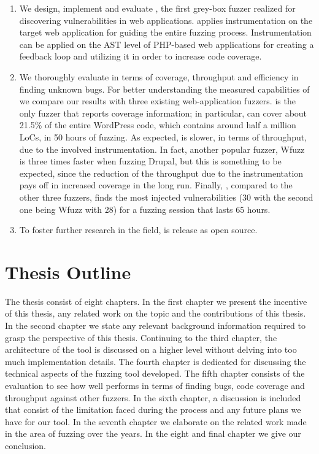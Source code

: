 \begin{enumerate}

\item We design, implement and evaluate \pname{}, the first grey-box fuzzer realized for discovering vulnerabilities in web applications. \pname{} applies instrumentation on the target web application for guiding the entire fuzzing process. Instrumentation can be applied on the AST level of PHP-based web applications for creating a feedback loop and utilizing it in order to increase code coverage.
\item We thoroughly evaluate \pname{} in terms of coverage, throughput and efficiency in finding unknown bugs. For better understanding the measured capabilities of \pname{} we compare our results with three existing web-application fuzzers. \pname{} is the only fuzzer that
reports coverage information; in particular, \pname{} can cover about 21.5\% of the entire WordPress code, which contains around half a million LoCs, in 50 hours of fuzzing. As expected, \pname{} is slower, in terms of throughput, due to the involved instrumentation. In fact, another popular fuzzer, Wfuzz ~\cite{wfuzz} is three times faster when fuzzing Drupal, but this is something to be expected, since the reduction of the throughput due to the instrumentation pays off in increased coverage in the long run. Finally, \pname{}, compared to the other three fuzzers, finds the most injected vulnerabilities (30 with the second one being Wfuzz with 28) for a fuzzing session that lasts 65 hours.
\item To foster further research in the field, \pname{} is release as open source.

\end{enumerate}

\section{Thesis Outline}
The thesis consist of eight chapters. In the first chapter we present the incentive of this thesis, any related work on the topic and the contributions of this thesis. In the second chapter we state any relevant background information required to grasp the perspective of this thesis. Continuing to the third chapter, the architecture of the tool is discussed on a higher level without delving into too much implementation details. The fourth chapter is dedicated for discussing the technical aspects of the fuzzing tool developed. The fifth chapter consists of the evaluation to see how well \pname{} performs in terms of finding bugs, code coverage and throughput against other fuzzers. In the sixth chapter, a discussion is included that consist of the limitation faced during the process and any future plans we have for our tool. In the seventh chapter we elaborate on the related work made in the area of fuzzing over the years. In the eight and final chapter we give our conclusion.
